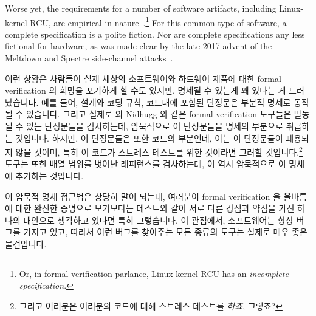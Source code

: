 Worse yet, the requirements for a number of software artifacts,
including Linux-kernel RCU, are empirical in
nature~\cite{PaulEMcKenney2015RCUreqts1,PaulEMcKenney2015RCUreqts2,PaulEMcKenney2015RCUreqts3}.\footnote{
	Or, in formal-verification parlance, Linux-kernel RCU has an
	\emph{incomplete specification}.}
For this common type of software, a complete specification is a
polite fiction.
Nor are complete specifications any less fictional for hardware,
as was made clear by the late 2017 advent of the Meltdown and Spectre
side-channel attacks~\cite{JannHorn2018MeltdownSpectre}.
\fi

이런 상황은 사람들이 실제 세상의 소프트웨어와 하드웨어 제품에 대한 formal
verification 의 희망을 포기하게 할 수도 있지만, 명세될 수 있는게 꽤 있다는 게
드러났습니다.
예를 들어, 설계와 코딩 규칙, 코드내에 포함된 단정문은 부분적 명세로 동작될 수
있습니다.
그리고 실제로  와 Nidhugg 와 같은 formal-verification 도구들은 발동될
수 있는 단정문들을 검사하는데, 암묵적으로 이 단정문들을 명세의 부분으로
취급하는 것입니다.
하지만, 이 단정문들은 또한 코드의 부분인데, 이는 이 단정문들이 폐용되지 않을
것이며, 특히 이 코드가 스트레스 테스트를 위한 것이라면 그러할
것입니다.\footnote{
	그리고 여러분은 여러분의 코드에 대해 스트레스 테스트를 \emph{하죠},
	그렇죠?}
 도구는 또한 배열 범위를 벗어난 레퍼런스를 검사하는데, 이 역시
암묵적으로 이 명세에 추가하는 것입니다.
\iffalse

This situation might cause one to give up all hope of formal verification
of real-world software and hardware artifacts, but it turns out that there is
quite a bit that can be done.
For example, design and coding rules can act as a partial specification,
as can assertions contained in the code.
And in fact formal-verification tools such as \co{cbmc} and Nidhugg
both check for assertions that can be triggered, implicitly treating
these assertions as part of the specification.
However, the assertions are also part of the code, which makes it less
likely that they will become obsolete, especially if the code is
also subjected to stress tests.\footnote{
	And you \emph{do} stress-test your code, don't you?}
The \co{cbmc} tool also checks for array-out-of-bound references,
thus implicitly adding them to the specification.
\fi

이 암묵적 명세 접근법은 상당히 말이 되는데, 여러분이 formal verification 을
올바름에 대한 완전한 증명으로 보기보다는 테스트와 같이 서로 다른 강점과 약점을
가진 하나의 대안으로 생각하고 있다면 특히 그렇습니다.
이 관점에서, 소프트웨어는 항상 버그를 가지고 있고, 따라서 이런 버그를 찾아주는
모든 종류의 도구는 실제로 매우 좋은 물건입니다.
\iffalse

